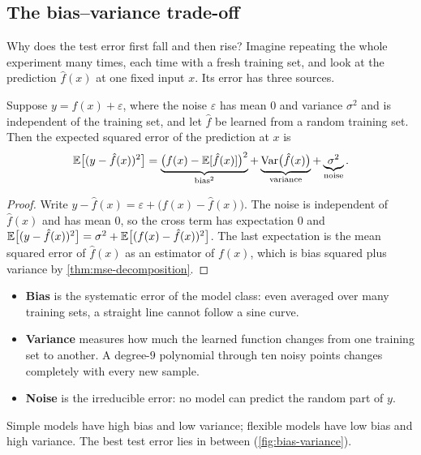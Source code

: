 \subsection{The bias--variance trade-off}

Why does the test error first fall and then rise? Imagine repeating the whole
experiment many times, each time with a fresh training set, and look at the
prediction $\hat f(x)$ at one fixed input $x$. Its error has three sources.

\begin{theorem}\label{thm:bias-variance}
Suppose $y = f(x) + \varepsilon$, where the noise $\varepsilon$ has mean $0$ and
variance $\sigma^2$ and is independent of the training set, and let $\hat f$ be
learned from a random training set. Then the expected squared error of the
prediction at $x$ is
\[
  \mathbb{E}\bigl[(y - \hat f(x))^2\bigr]
  = \underbrace{\bigl(f(x) - \mathbb{E}[\hat f(x)]\bigr)^2}_{\text{bias}^2}
  + \underbrace{\operatorname{Var}\bigl(\hat f(x)\bigr)}_{\text{variance}}
  + \underbrace{\sigma^2}_{\text{noise}} .
\]
\end{theorem}

\begin{proof}
Write $y - \hat f(x) = \varepsilon + \bigl(f(x) - \hat f(x)\bigr)$. The noise is
independent of $\hat f(x)$ and has mean $0$, so the cross term has expectation
$0$ and $\mathbb{E}\bigl[(y - \hat f(x))^2\bigr] = \sigma^2 + \mathbb{E}\bigl[(f(x) - \hat
f(x))^2\bigr]$. The last expectation is the mean squared error of $\hat f(x)$ as
an estimator of $f(x)$, which is bias squared plus variance by
\cref{thm:mse-decomposition}.
\end{proof}

\begin{itemize}
  \item \textbf{Bias} is the systematic error of the model class: even averaged
    over many training sets, a straight line cannot follow a sine curve.
  \item \textbf{Variance} measures how much the learned function changes from one
    training set to another. A degree-$9$ polynomial through ten noisy points
    changes completely with every new sample.
  \item \textbf{Noise} is the irreducible error: no model can predict the random
    part of $y$.
\end{itemize}
Simple models have high bias and low variance; flexible models have low bias and
high variance. The best test error lies in between (\cref{fig:bias-variance}).


